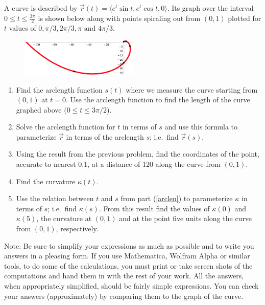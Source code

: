 \documentclass[12pt,letterpaper,fleqn]{article}
\newcommand{\lv}[1]{\ensuremath{\langle #1 \rangle}}
\begin{document}
A curve is described by $\vec{r}(t) = \lv{e^t \sin t, e^t \cos t, 0}$. Its graph
over the interval $0 \leq t \leq \frac{3\pi}{2}$ is shown below along with points
spiraling out from $(0,1)$ plotted for $t$ values of $0, \pi/3, 2\pi/3, \pi
 \text{ and } 4\pi/3$.\\
\begin{figure}[!htb]
 \centering
 \includegraphics[width=0.5\textwidth]{img/curve_graph.png}
\end{figure}
\begin{enumerate}
 \item Find the arclength function $s(t)$ where we measure the curve starting
       from $(0,1)$ at $t = 0$. Use the arclength function to find the length of
       the curve graphed above ($0 \leq t \leq 3\pi/2$).
 \item Solve the arclength function for $t$ in terms of $s$ and use this formula
       to parameterize $\vec{r}$ in terms of the arclength $s$; i.e.\ find $\vec{r}(s)$.
       \label{arclen}
 \item Using the result from the previous problem, find the coordinates of the point,
       accurate to nearest 0.1, at a distance of 120 along the curve from $(0,1)$.
 \item Find the curvature $\kappa(t)$.
 \item Use the relation between $t$ and $s$ from part (\ref{arclen}) to parameterize
       $\kappa$ in terms of $s$; i.e.\ find $\kappa(s)$. From this result find the values
       of $\kappa(0)$ and $\kappa(5)$, the curvature at $(0,1)$ and at the point five
       units along the curve from $(0,1)$, respectively.
\end{enumerate}
Note: Be sure to simplify your expressions as much as possible and to write you
answers in a pleasing form. If you use Mathematica, Wolfram Alpha or similar
tools, to do some of the calculations, you must print or take screen shots of
the computations and hand them in with the rest of your work. All the answers,
when appropriately simplified, should be fairly simple expressions. You can check
your answers (approximately) by comparing them to the graph of the curve.
\end{document}
